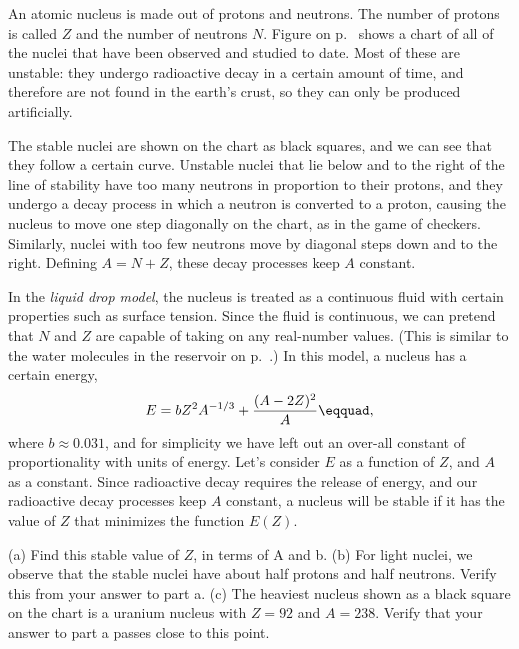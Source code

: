An atomic nucleus is made out of protons and neutrons. The number of protons
is called $Z$ and the number of neutrons $N$. Figure 
on p.~\pageref{fig:hw-line-of-stability} shows a chart of all of the nuclei that have
been observed and studied to date. Most of these are unstable: they undergo radioactive
decay in a certain amount of time, and therefore are not found in the earth's crust,
so they can only be produced artificially.

The stable nuclei are shown on the chart
as black squares, and we can see that they follow a certain curve. Unstable nuclei
that lie below and to the right of the line of stability have too many neutrons in
proportion to their protons, and they undergo a decay process in which a neutron
is converted to a proton, causing the nucleus to move one step diagonally on the
chart, as in the game of checkers. Similarly, nuclei with too few neutrons move
by diagonal steps down and to the right. Defining $A=N+Z$, these decay processes keep
$A$ constant.

In the \emph{liquid drop model}, the nucleus is treated as a continuous fluid with
certain properties such as surface tension. Since the fluid is continuous, we can
pretend that $N$ and $Z$ are capable of taking on any real-number values. (This is similar to
the water molecules in the reservoir on p.~\pageref{fig:reservoir}.) In this model,
a nucleus has a certain energy,
\begin{equation*}
  E = bZ^2A^{-1/3}+\frac{(A-2Z)^2}{A}\eqquad,
\end{equation*}
where $b\approx0.031$, and for simplicity we have left out
an over-all constant of proportionality with units of energy.
Let's consider $E$ as a function of $Z$, and $A$ as a constant.
Since radioactive decay requires the release of energy, and our radioactive decay
processes keep $A$ constant, a nucleus will be stable if it has the value
of $Z$ that minimizes the function $E(Z)$.

(a) Find this stable value of $Z$, in terms of A and b.\answercheck\hwendpart
(b) For light nuclei, we observe that the stable nuclei have about half protons and
half neutrons. Verify this from your answer to part a.\hwendpart
(c) The heaviest nucleus shown as a black square on the chart is a uranium nucleus
with $Z=92$ and $A=238$. Verify that your answer to part a passes close to this point.
